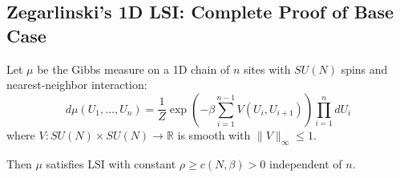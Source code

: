 \subsection{Zegarlinski's 1D LSI: Complete Proof of Base Case}

\begin{theorem}
\label{thm:1d-lsi-complete}
Let $\mu$ be the Gibbs measure on a 1D chain of $n$ sites with $SU(N)$ spins and 
nearest-neighbor interaction:
\[
d\mu(U_1, \ldots, U_n) = \frac{1}{Z} \exp\left(-\beta \sum_{i=1}^{n-1} V(U_i, U_{i+1})\right) 
\prod_{i=1}^n dU_i
\]
where $V: SU(N) \times SU(N) \to \mathbb{R}$ is smooth with $\|V\|_\infty \leq 1$.

Then $\mu$ satisfies LSI with constant $\rho \geq c(N, \beta) > 0$ independent of $n$.
\end{theorem}

